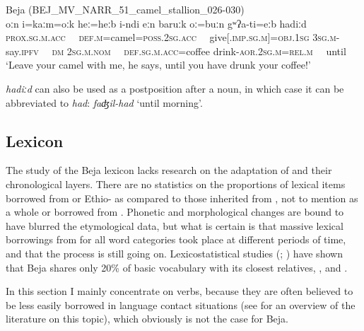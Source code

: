 \documentclass[output=paper]{langsci/langscibook}
\begin{document}
\ea\label{ex:vanhove:}
{Beja (BEJ\_MV\_NARR\_51\_camel\_stallion\_026-030)}\\
\gll oːn i=kaːm=oːk heː=heːb i-ndi eːn baruːk oː=buːn gʷʔa-ti=eːb hadiːd\\
     \textsc{prox.sg.m.acc}~~ \textsc{def.m}=camel=\textsc{poss.2sg.acc}~~ give[.\textsc{imp.sg.m]=obj.1sg} \textsc{3sg.m}{}-say.\textsc{ipfv}~~ \textsc{dm} \textsc{2sg.m.nom}~~ \textsc{def.sg.m.acc}=coffee drink-\textsc{aor.2sg.m=rel.m}~~ until\\
\glt `Leave your camel with me, he says, until you have drunk your coffee!'
\z

\textit{hadiːd} can also be used as a postposition after a noun, in which case it can be abbreviated to \textit{had}: \textit{faʤil-had} ‘until morning’.


 
 \subsection{Lexicon}


The study of the Beja lexicon lacks research on the adaptation of   and their chronological layers. There are no statistics on the proportions of lexical items borrowed from  or Ethio- as compared to those inherited from , not to mention  as a whole or borrowed from . Phonetic and morphological changes are bound to have blurred the etymological data, but what is certain is that massive lexical borrowings from  for all word categories took place at different periods of time, and that the process is still going on. Lexicostatistical studies (\citealt[267]{Cohen1988}; \citealt{Blažek1997}) have shown that Beja shares only 20\% of basic vocabulary with its closest relatives, ,  and .

In this section I mainly concentrate on verbs, because they are often believed to be less  easily borrowed in language contact situations (see \citealt{Wohlgemuth2009} for an overview of the literature on this topic), which obviously is not the case for Beja.
\end{document}
